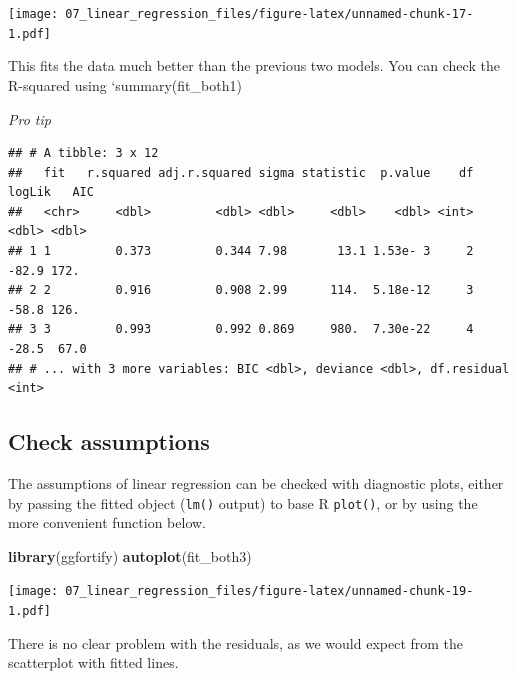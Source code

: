 \documentclass[12pt,]{krantz}
\makeatletter
\newenvironment{Shaded}{\begin{snugshade}}{\end{snugshade}}
\newcommand{\DataTypeTok}[1]{\textcolor[rgb]{0.13,0.29,0.53}{#1}}
\newcommand{\KeywordTok}[1]{\textcolor[rgb]{0.13,0.29,0.53}{\textbf{#1}}}
\newcommand{\NormalTok}[1]{#1}
\newcommand{\OperatorTok}[1]{\textcolor[rgb]{0.81,0.36,0.00}{\textbf{#1}}}
\newcommand{\StringTok}[1]{\textcolor[rgb]{0.31,0.60,0.02}{#1}}
\newenvironment{kframe}{%
\medskip{}
\setlength{\fboxsep}{.8em}
 \def\at@end@of@kframe{}%
 \ifinner\ifhmode%
  \def\at@end@of@kframe{\end{minipage}}%
  \begin{minipage}{\columnwidth}%
 \fi\fi%
 \def\FrameCommand##1{\hskip\@totalleftmargin \hskip-\fboxsep
 \colorbox{shadecolor}{##1}\hskip-\fboxsep
     \hskip-\linewidth \hskip-\@totalleftmargin \hskip\columnwidth}%
 \MakeFramed {\advance\hsize-\width
   \@totalleftmargin\z@ \linewidth\hsize
   \@setminipage}}%
 {\par\unskip\endMakeFramed%
 \at@end@of@kframe}
\renewenvironment{Shaded}{\begin{kframe}}{\end{kframe}}
\theoremstyle{definition}
\theoremstyle{definition}
\theoremstyle{definition}
\theoremstyle{remark}
\makeatother
\begin{document}
\texttt{[image: 07\_linear\_regression\_files/figure-latex/unnamed-chunk-17-1.pdf]}

This fits the data much better than the previous two models. You can
check the R-squared using `summary(fit\_both1)

\emph{Pro tip}

\begin{Shaded}
\end{Shaded}

\begin{verbatim}
## # A tibble: 3 x 12
##   fit   r.squared adj.r.squared sigma statistic  p.value    df logLik   AIC
##   <chr>     <dbl>         <dbl> <dbl>     <dbl>    <dbl> <int>  <dbl> <dbl>
## 1 1         0.373         0.344 7.98       13.1 1.53e- 3     2  -82.9 172. 
## 2 2         0.916         0.908 2.99      114.  5.18e-12     3  -58.8 126. 
## 3 3         0.993         0.992 0.869     980.  7.30e-22     4  -28.5  67.0
## # ... with 3 more variables: BIC <dbl>, deviance <dbl>, df.residual <int>
\end{verbatim}

\hypertarget{check-assumptions}{%
\subsection{Check assumptions}\label{check-assumptions}}

The assumptions of linear regression can be checked with diagnostic
plots, either by passing the fitted object (\texttt{lm()} output) to
base R \texttt{plot()}, or by using the more convenient function below.

\begin{Shaded}
\begin{Highlighting}[]
\KeywordTok{library}\NormalTok{(ggfortify)}
\KeywordTok{autoplot}\NormalTok{(fit_both3)}
\end{Highlighting}
\end{Shaded}

\texttt{[image: 07\_linear\_regression\_files/figure-latex/unnamed-chunk-19-1.pdf]}

There is no clear problem with the residuals, as we would expect from
the scatterplot with fitted lines.
\end{document}
